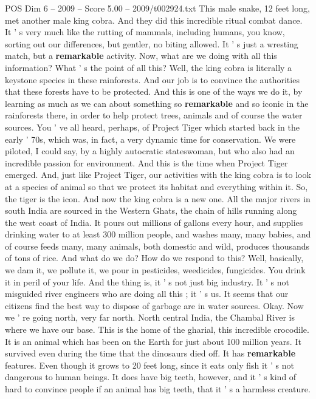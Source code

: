 \begin{textsample}{POS Dim 6 – 2009 – Score 5.00 – 2009/t002924.txt}
This male snake, 12 feet long, met another male king cobra.
And they did this incredible ritual combat dance.
It ' s very much like the rutting of mammals, including humans, you know, sorting out our differences, but gentler, no biting allowed.
It ' s just a wresting match, but a \textbf{remarkable} activity.
Now, what are we doing with all this information?
What ' s the point of all this?
Well, the king cobra is literally a keystone species in these rainforests.
And our job is to convince the authorities that these forests have to be protected.
And this is one of the ways we do it, by learning as much as we can about something so \textbf{remarkable} and so iconic in the rainforests there, in order to help protect trees, animals and of course the water sources.
You ' ve all heard, perhaps, of Project Tiger which started back in the early ' 70s, which was, in fact, a very dynamic time for conservation.
We were piloted, I could say, by a highly autocratic stateswoman, but who also had an incredible passion for environment.
And this is the time when Project Tiger emerged.
And, just like Project Tiger, our activities with the king cobra is to look at a species of animal so that we protect its habitat and everything within it.
So, the tiger is the icon.
And now the king cobra is a new one.
All the major rivers in south India are sourced in the Western Ghats, the chain of hills running along the west coast of India.
It pours out millions of gallons every hour, and supplies drinking water to at least 300 million people, and washes many, many babies, and of course feeds many, many animals, both domestic and wild, produces thousands of tons of rice.
And what do we do?
How do we respond to this?
Well, basically, we dam it, we pollute it, we pour in pesticides, weedicides, fungicides.
You drink it in peril of your life.
And the thing is, it ' s not just big industry.
It ' s not misguided river engineers who are doing all this ; it ' s us.
It seems that our citizens find the best way to dispose of garbage are in water sources.
Okay.
Now we ' re going north, very far north.
North central India, the Chambal River is where we have our base.
This is the home of the gharial, this incredible crocodile.
It is an animal which has been on the Earth for just about 100 million years.
It survived even during the time that the dinosaurs died off.
It has \textbf{remarkable} features.
Even though it grows to 20 feet long, since it eats only fish it ' s not dangerous to human beings.
It does have big teeth, however, and it ' s kind of hard to convince people if an animal has big teeth, that it ' s a harmless creature.

\end{textsample}
